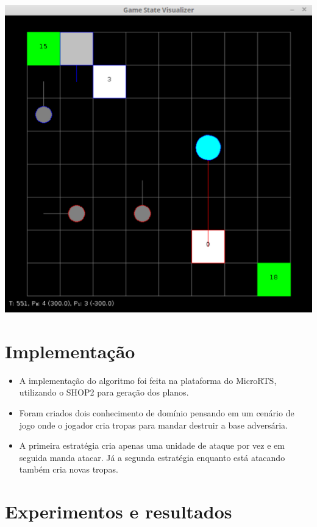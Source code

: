 \documentclass[a0,portrait]{a0poster}
\begin{document}
\begin{multicols}{2}
		\vspace{8mm}
		
		\begin{center}
			\includegraphics[width=0.5\linewidth]{fig/microRts.pdf}
		\end{center}	
		
	\color{NavyBlue}
	\section*{\huge Implementação}
	\color{Black}
	\begin{itemize}
		\item A implementação do algoritmo foi feita na plataforma do MicroRTS, utilizando o SHOP2 para geração dos planos.
		\item Foram criados dois conhecimento de domínio pensando em um cenário de jogo onde o jogador cria tropas para mandar destruir a base adversária.
		\item A primeira estratégia cria apenas uma unidade de ataque por vez e em seguida manda atacar. Já a segunda estratégia enquanto está atacando também cria novas tropas.  
	\end{itemize}

	\color{NavyBlue}
	\section*{\huge Experimentos e resultados}
	\color{Black}


\end{multicols}
\end{document}
